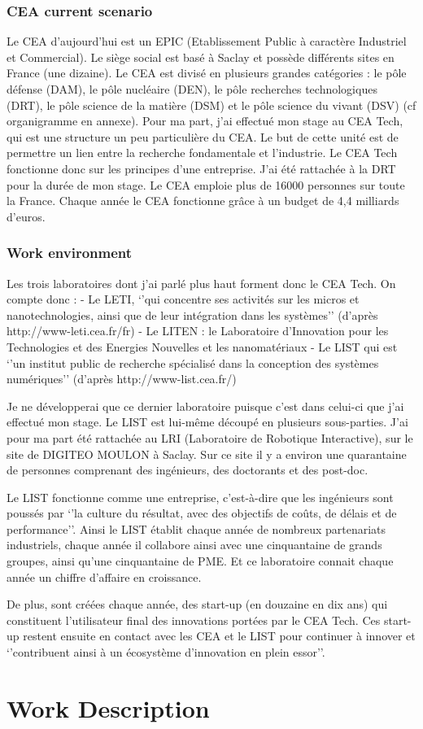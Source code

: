 \subsection{CEA current scenario}

Le CEA d’aujourd’hui est un EPIC (Etablissement Public à caractère Industriel et Commercial). Le siège social est basé à Saclay et possède différents sites en France (une dizaine). Le CEA est divisé en plusieurs grandes catégories : le pôle défense (DAM), le pôle nucléaire (DEN), le pôle recherches technologiques (DRT), le pôle science de la matière (DSM) et le pôle science du vivant (DSV) (cf organigramme en annexe).
Pour ma part, j’ai effectué mon stage au CEA Tech, qui est une structure un peu particulière du CEA. Le but de cette unité est de permettre un lien entre la recherche fondamentale et l’industrie. Le CEA Tech fonctionne donc sur les principes d’une entreprise. J’ai été rattachée à la DRT pour la durée de mon stage.
Le CEA emploie plus de 16000 personnes sur toute la France. Chaque année le CEA fonctionne grâce à un budget de 4,4 milliards d’euros.

\subsection{Work environment}

Les trois laboratoires dont j’ai parlé plus haut forment donc le CEA Tech. On compte donc :
-	Le LETI, ‘’qui concentre ses activités sur les micros et nanotechnologies, ainsi que de leur intégration dans les systèmes’’ (d’après http://www-leti.cea.fr/fr)
-	Le LITEN : le Laboratoire d’Innovation pour les Technologies et des Energies Nouvelles et les nanomatériaux
-	Le LIST qui est  ‘’un institut public de recherche spécialisé dans la conception des systèmes numériques’’ (d’après http://www-list.cea.fr/)

Je ne développerai que ce dernier laboratoire puisque c’est dans celui-ci que j’ai effectué mon stage. Le LIST est lui-même découpé en plusieurs sous-parties. J’ai pour ma part été rattachée au LRI (Laboratoire de Robotique Interactive), sur le site de DIGITEO MOULON à Saclay. Sur ce site il y a environ une quarantaine de personnes comprenant des ingénieurs, des doctorants et des post-doc.

Le LIST fonctionne comme une entreprise, c’est-à-dire que les ingénieurs sont poussés par ‘’la culture du résultat, avec des objectifs de coûts, de délais et de performance’’.  Ainsi le LIST établit chaque année de nombreux partenariats industriels, chaque année il collabore ainsi avec une cinquantaine de grands groupes, ainsi qu’une cinquantaine de PME. Et ce laboratoire connait chaque année un chiffre d’affaire en croissance.

De plus, sont créées chaque année, des start-up (en  douzaine en dix ans) qui constituent l’utilisateur final des innovations portées par le CEA Tech. Ces start-up restent ensuite en contact avec les CEA et le LIST pour continuer à innover et ‘’contribuent ainsi à un écosystème d’innovation en plein essor’’.

\chapter{Work Description}
\lipsum[1-3]
